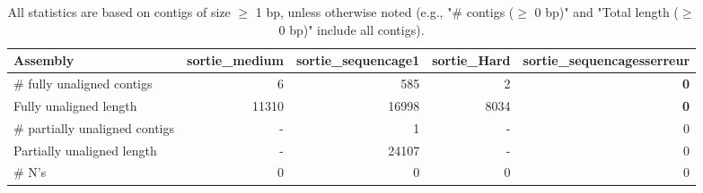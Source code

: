 \documentclass[12pt,a4paper]{article}
\begin{document}
\begin{table}[ht]
\begin{center}
\caption{All statistics are based on contigs of size $\geq$ 1 bp, unless otherwise noted (e.g., "\# contigs ($\geq$ 0 bp)" and "Total length ($\geq$ 0 bp)" include all contigs).}
\begin{tabular}{|l*{4}{|r}|}
\hline
Assembly & sortie\_medium & sortie\_sequencage1 & sortie\_Hard & sortie\_sequencagesserreur \\ \hline
\# fully unaligned contigs & 6 & 585 & 2 & {\bf 0} \\ \hline
Fully unaligned length & 11310 & 16998 & 8034 & {\bf 0} \\ \hline
\# partially unaligned contigs & - & 1 & - & 0 \\ \hline
Partially unaligned length & - & 24107 & - & 0 \\ \hline
\# N's & 0 & 0 & 0 & 0 \\ \hline
\end{tabular}
\end{center}
\end{table}
\end{document}
